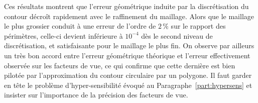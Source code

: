 Ces résultats montrent que l'erreur géométrique induite par la discrétisation du contour décroît rapidement avec le raffinement du maillage. Alors que le maillage le plus grossier conduit à une erreur de l'ordre de $2\,\%$ sur le rapport des périmètres, celle-ci devient inférieure à $10^{-4}$ dès le second niveau de discrétisation, et satisfaisante pour le maillage le plus fin. On observe par ailleurs un très bon accord entre l'erreur géométrique théorique et l'erreur effectivement observée sur les facteurs de vue, ce qui confirme que cette dernière est bien pilotée par l'approximation du contour circulaire par un polygone. Il faut garder en tête le problème d'hyper-sensibilité évoqué au Paragraphe~\ref{part:hypersens} et insister sur l'importance de la précision des facteurs de vue.

















